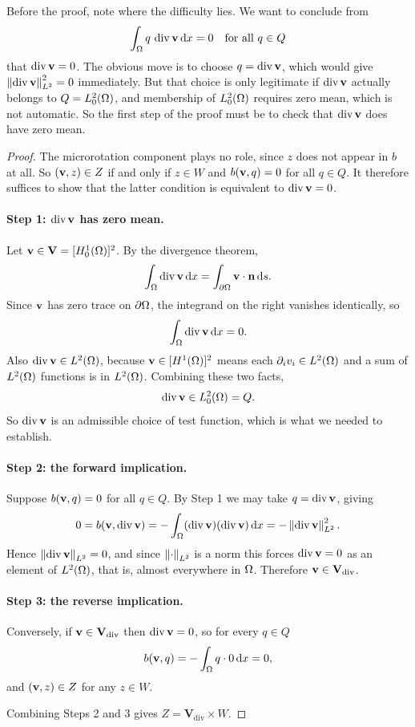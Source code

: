 \documentclass[11pt,a4paper]{article}
\newcommand{\Vdiv}{\mathbf{V}_{\mathrm{div}}}
\newcommand{\Vsp}{\mathbf{V}}
\newcommand{\Qsp}{Q}
\newcommand{\Wsp}{W}
\newcommand{\Zsp}{Z}
\begin{document}
Before the proof, note where the difficulty lies. We want to conclude from
\[
  \int_\Om q \,\dive \bv \dx = 0 \quad \text{for all } q \in \Qsp
\]
that $\operatorname{div} \mathbf{v} = 0$. The obvious move is to choose $q = \operatorname{div} \mathbf{v}$, which would
give $\left\lVert \operatorname{div} \mathbf{v} \right\rVert_{L^{2}}^{2} = 0$ immediately. But that choice is only legitimate
if $\operatorname{div} \mathbf{v}$ actually belongs to $\Qsp = \Ltwozero$, and membership of
$L^{2}_{0}(\Omega)$ requires zero mean, which is not automatic. So the first step of the
proof must be to check that $\operatorname{div} \mathbf{v}$ does have zero mean.

\begin{proof}
The microrotation component plays no role, since $z$ does not appear in $b$ at
all. So $(\bv,z) \in \Zsp$ if and only if $z \in \Wsp$ and $b(\mathbf{v},q) = 0$ for
all $q \in \Qsp$. It therefore suffices to show that the latter condition is
equivalent to $\operatorname{div} \mathbf{v} = 0$.

\paragraph{Step 1: $\operatorname{div} \mathbf{v}$ has zero mean.}
Let $\bv \in \Vsp = [\Honezero]^{2}$. By the divergence theorem,
\[
  \int_\Omega \operatorname{div} \mathbf{v} \,\mathrm{d}x = \int_{\partial\Omega} \mathbf{v} \cdot \mathbf{n} \,\mathrm{d}s .
\]
Since $\mathbf{v}$ has zero trace on $\partial\Omega$, the integrand on the right vanishes
identically, so
\begin{equation}\label{eq:divzeromean}
  \int_\Omega \operatorname{div} \mathbf{v} \,\mathrm{d}x = 0 .
\end{equation}
Also $\operatorname{div} \mathbf{v} \in L^{2}(\Omega)$, because $\mathbf{v} \in [H^{1}(\Omega)]^{2}$ means each
$\partial_{i}v_{i} \in L^{2}(\Omega)$ and a sum of $L^{2}(\Omega)$ functions is in $L^{2}(\Omega)$.
Combining these two facts,
\[
  \dive \bv \in \Ltwozero = \Qsp .
\]
So $\operatorname{div} \mathbf{v}$ is an admissible choice of test function, which is what we needed
to establish.

\paragraph{Step 2: the forward implication.}
Suppose $b(\mathbf{v},q) = 0$ for all $q \in \Qsp$. By Step 1 we may take
$q = \operatorname{div} \mathbf{v}$, giving
\[
  0 = b(\mathbf{v}, \operatorname{div} \mathbf{v}) = -\int_\Omega (\operatorname{div} \mathbf{v})(\operatorname{div} \mathbf{v}) \,\mathrm{d}x
  = - \left\lVert \operatorname{div} \mathbf{v} \right\rVert_{L^{2}}^{2} .
\]
Hence $\left\lVert \operatorname{div} \mathbf{v} \right\rVert_{L^{2}} = 0$, and since $\left\lVert \cdot \right\rVert_{L^{2}}$ is a norm this forces
$\operatorname{div} \mathbf{v} = 0$ as an element of $L^{2}(\Omega)$, that is, almost everywhere in $\Omega$.
Therefore $\bv \in \Vdiv$.

\paragraph{Step 3: the reverse implication.}
Conversely, if $\bv \in \Vdiv$ then $\operatorname{div} \mathbf{v} = 0$, so for every $q \in \Qsp$
\[
  b(\mathbf{v},q) = -\int_\Omega q \cdot 0 \,\mathrm{d}x = 0 ,
\]
and $(\bv,z) \in \Zsp$ for any $z \in \Wsp$.

Combining Steps 2 and 3 gives $\Zsp = \Vdiv \times \Wsp$.
\end{proof}
\end{document}
